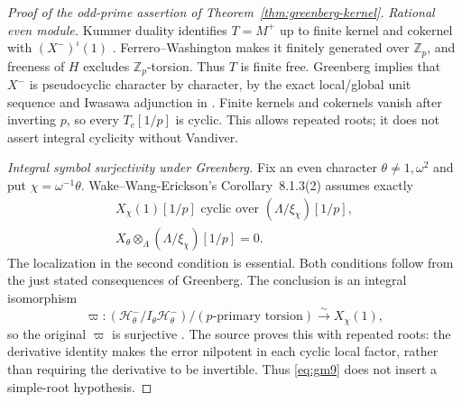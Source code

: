 \documentclass[11pt]{article}
\theoremstyle{definition}
\numberwithin{equation}{section}
\begin{document}
\begin{proof}[Proof of the odd-prime assertion of Theorem~\ref{thm:greenberg-kernel}]
\emph{Rational even module.}
Kummer duality identifies $T=M^+$ up to finite kernel and cokernel
with $(X^-)^\iota(1)$
\cite[Proposition~3.4.7 and Corollary~3.4.8,
p.~92]{SharifiIwasawaNotes}.
Ferrero--Washington makes it finitely generated over $\mathbb Z_p$,
and freeness of $H$ excludes $\mathbb Z_p$-torsion. Thus $T$ is
finite free. Greenberg implies that $X^-$ is pseudocyclic
character by character, by the exact local/global unit sequence and
Iwasawa adjunction in
\cite[Corollary~2.1.3 and Conjecture~2.1.5 with the following
explanation, p.~8]{WakeWangEricksonPseudo2018}.
Finite kernels and cokernels vanish after inverting $p$, so every
$T_e[1/p]$ is cyclic. This allows repeated roots; it does not assert
integral cyclicity without Vandiver.

\emph{Integral symbol surjectivity under Greenberg.}
Fix an even character $\theta\ne1,\omega^2$ and put
$\chi=\omega^{-1}\theta$. Wake--Wang-Erickson's
Corollary~8.1.3(2) assumes exactly
\begin{equation}
 \begin{gathered}
 X_\chi(1)[1/p]\text{ cyclic over }(\Lambda/\xi_\chi)[1/p],\\
 X_\theta\otimes_\Lambda(\Lambda/\xi_\chi)[1/p]=0.
 \end{gathered}                                            \label{eq:gm8}
\end{equation}
The localization in the second condition is essential.
Both conditions follow from the just stated consequences of
Greenberg. The conclusion is an integral isomorphism
\begin{equation}
 \varpi:(\mathcal H^-_\theta/I_\theta\mathcal H^-_\theta)
           /(p\text{-primary torsion})
       \xrightarrow{\ \sim\ }X_\chi(1),                    \label{eq:gm9}
\end{equation}
so the original $\varpi$ is surjective
\cite[Corollary~8.1.3 and complete proof,
pp.~48--49]{WakeWangEricksonPseudo2018}.
The source proves this with repeated roots: the derivative identity
makes the error nilpotent in each cyclic local factor, rather than
requiring the derivative to be invertible. Thus \eqref{eq:gm9} does not
insert a simple-root hypothesis.


\end{proof}
\end{document}
